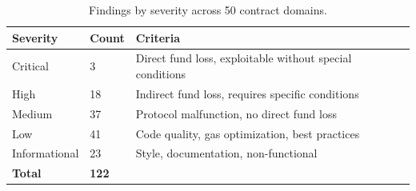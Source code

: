 \begin{table}[H]
\centering
\small
\begin{tabular}{@{}llp{8cm}@{}}
\toprule
\textbf{Severity} & \textbf{Count} & \textbf{Criteria} \\
\midrule
Critical & 3 & Direct fund loss, exploitable without special conditions \\
High & 18 & Indirect fund loss, requires specific conditions \\
Medium & 37 & Protocol malfunction, no direct fund loss \\
Low & 41 & Code quality, gas optimization, best practices \\
Informational & 23 & Style, documentation, non-functional \\
\midrule
\textbf{Total} & \textbf{122} & \\
\bottomrule
\end{tabular}
\caption{Findings by severity across 50 contract domains.}
\end{table}

